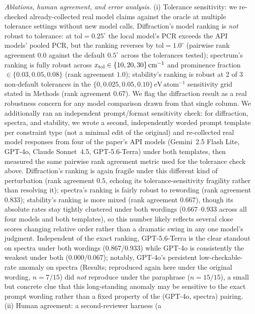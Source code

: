\documentclass[pdflatex,sn-nature]{sn-jnl}
\begin{document}
\noindent\emph{Ablations, human agreement, and error analysis.} (i) Tolerance sensitivity:
we re-checked already-collected real model claims against the oracle at multiple tolerance
settings without new model calls. Diffraction's model ranking is \emph{not} robust to
tolerance: at $\mathrm{tol}=0.25^\circ$ the local model's PCR exceeds the API models'
pooled PCR, but the ranking reverses by $\mathrm{tol}=1.0^\circ$ (pairwise rank agreement
$0.0$ against the default $0.5^\circ$ across the tolerances tested); spectrum's ranking is
fully robust across $x_{\rm tol}\in\{10,20,30\}\,\mathrm{cm}^{-1}$ and prominence fraction
$\in\{0.03,0.05,0.08\}$ (rank agreement $1.0$); stability's ranking is robust at 2 of 3
non-default tolerances in the $\{0,0.025,0.05,0.10\}\,\mathrm{eV\,atom^{-1}}$ sensitivity
grid stated in Methods (rank agreement $0.67$). We flag the diffraction result as a real robustness concern
for any model comparison drawn from that single column. We additionally ran an independent
prompt/format sensitivity check: for diffraction, spectra, and stability, we wrote a second,
independently worded prompt template per constraint type (not a minimal edit of the
original) and re-collected real model responses from four of the paper's API models
(Gemini~2.5 Flash Lite, GPT-4o, Claude Sonnet~4.5, GPT-5.6-Terra) under both templates, then
measured the same pairwise rank agreement metric used for the tolerance check above.
Diffraction's ranking is again fragile under this different kind of perturbation (rank
agreement $0.5$, echoing its tolerance-sensitivity fragility rather than resolving it);
spectra's ranking is fairly robust to rewording (rank agreement $0.833$); stability's ranking
is more mixed (rank agreement $0.667$), though its absolute rates stay tightly clustered
under both wordings ($0.667$--$0.933$ across all four models and both templates), so this
number likely reflects several close scores changing relative order rather than a dramatic
swing in any one model's judgment. Independent of the exact ranking, GPT-5.6-Terra is the
clear standout on spectra under both wordings ($0.867$/$0.933$) while GPT-4o is consistently
the weakest under both ($0.000$/$0.067$); notably, GPT-4o's persistent low-checkable-rate
anomaly on spectra (Results; reproduced again here under the original wording, $n=7/15$) did
\emph{not} reproduce under the paraphrase ($n=15/15$), a small but concrete clue that this
long-standing anomaly may be sensitive to the exact prompt wording rather than a fixed
property of the (GPT-4o, spectra) pairing. (ii) Human agreement: a second-reviewer harness (a
\end{document}
